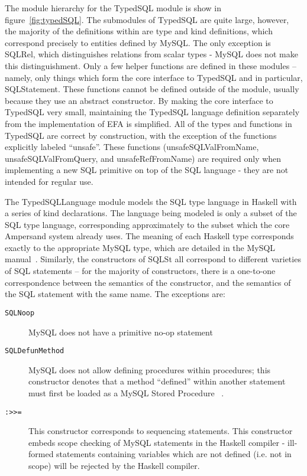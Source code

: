 \documentclass[12pt, svgnames]{article}
\begin{document}
The module hierarchy for the TypedSQL module is show in
figure~\ref{fig:typedSQL}. The submodules of TypedSQL are quite large, however,
the majority of the definitions within are type and kind definitions, which correspond 
precisely to entities defined by MySQL. The only exception is SQLRel, which distinguishes
relations from scalar types - MySQL does not make this distinguishment. Only a few
helper functions are defined in these modules -- namely, only things which form
the core interface to TypedSQL and in particular, SQLStatement. These functions
cannot be defined outside of the module, usually because they use an abstract
constructor. By making the core interface to TypedSQL very small, maintaining 
the TypedSQL language definition separately from the implementation of 
EFA is simplified. All of the types and functions in TypedSQL are correct by 
construction, with the exception of the functions explicitly labeled ``unsafe''.
These functions (unsafeSQLValFromName, unsafeSQLValFromQuery, and unsafeRefFromName)
are required only when implementing a new SQL primitive on top of the SQL
language - they are not intended for regular use. 

The TypedSQLLanguage module models the SQL type language in Haskell with a
series of kind declarations. The language being modeled is only a subset of the
SQL type language, corresponding approximately to the subset which the core
Ampersand system already uses. The meaning of each Haskell type corresponds
exactly to the appropriate MySQL type, which are detailed in the MySQL
manual~\cite{mySQLman}. Similarly, the constructors of SQLSt all correspond
to different varieties of SQL statements -- for the majority of constructors,
there is a one-to-one correspondence between the semantics of the constructor,
and the semantics of the SQL statement with the same name. The exceptions 
are: 

\begin{description}
\item[\texttt{SQLNoop}] MySQL does not have a primitive no-op statement
\item[\texttt{SQLDefunMethod}]  MySQL does not allow defining procedures within procedures; 
  this constructor denotes that a method ``defined'' within another statement must 
  first be loaded as a MySQL Stored Procedure ~\cite{mySQLman}.
\item[\texttt{:>>=}] This constructor corresponds to sequencing statements. This constructor
  embeds scope checking of MySQL statements in the Haskell compiler - ill-formed statements
  containing variables which are not defined (i.e. not in scope) will be rejected by the Haskell
  compiler. 
\end{description}
\end{document}
